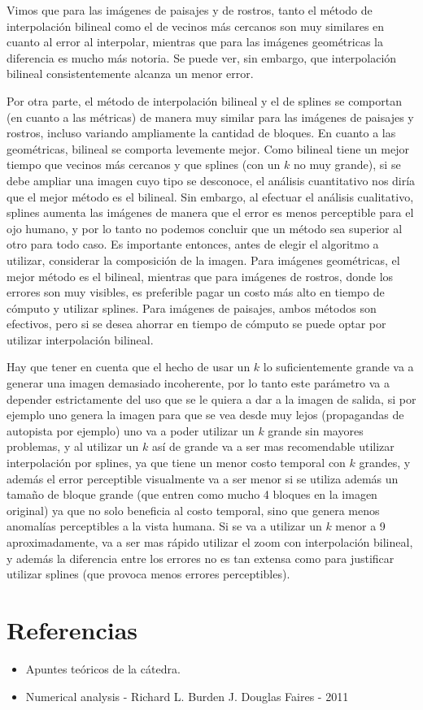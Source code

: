 \documentclass{article}
\begin{document}
Vimos que para las imágenes de paisajes y de rostros, tanto el método de interpolación bilineal como el de vecinos más cercanos son muy similares en cuanto al error al interpolar, mientras que para las imágenes geométricas la diferencia es mucho más notoria. Se puede ver, sin embargo, que interpolación bilineal consistentemente alcanza un menor error.

Por otra parte, el método de interpolación bilineal y el de splines se comportan (en cuanto a las métricas) de manera muy similar para las imágenes de paisajes y rostros, incluso variando ampliamente la cantidad de bloques. En cuanto a las geométricas, bilineal se comporta levemente mejor. Como bilineal tiene un mejor tiempo que vecinos más cercanos y que splines (con un $k$ no muy grande), si se debe ampliar una imagen cuyo tipo se desconoce, el análisis cuantitativo nos diría que el mejor método es el bilineal. Sin embargo, al efectuar el análisis cualitativo, splines aumenta las imágenes de manera que el error es menos perceptible para el ojo humano, y por lo tanto no podemos concluir que un método sea superior al otro para todo caso. Es importante entonces, antes de elegir el algoritmo a utilizar, considerar la composición de la imagen. Para imágenes geométricas, el mejor método es el bilineal, mientras que para imágenes de rostros, donde los errores son muy visibles, es preferible pagar un costo más alto en tiempo de cómputo y utilizar splines. Para imágenes de paisajes, ambos métodos son efectivos, pero si se desea ahorrar en tiempo de cómputo se puede optar por utilizar interpolación bilineal.

Hay que tener en cuenta que el hecho de usar un $k$ lo suficientemente grande va a generar una imagen demasiado incoherente, por lo tanto este parámetro va a depender estrictamente del uso que se le quiera a dar a la imagen de salida, si por ejemplo uno genera la imagen para que se vea desde muy lejos (propagandas de autopista por ejemplo) uno va a poder utilizar un $k$ grande sin mayores problemas, y al utilizar un $k$ así de grande va a ser mas recomendable utilizar interpolación por splines, ya que tiene un menor costo temporal con $k$ grandes, y además el error perceptible visualmente va a ser menor si se utiliza además un tamaño de bloque grande (que entren como mucho 4 bloques en la imagen original) ya que no solo beneficia al costo temporal, sino que genera menos anomalías perceptibles a la vista humana.
Si se va a utilizar un $k$ menor a 9 aproximadamente, va a ser mas rápido utilizar el zoom con interpolación bilineal, y además la diferencia entre los errores no es tan extensa como para justificar utilizar splines (que provoca menos errores perceptibles).

\section{Referencias}
\begin{itemize}
\item Apuntes teóricos de la cátedra.
\item Numerical analysis - Richard L. Burden J. Douglas Faires - 2011
\end{itemize}
\end{document}
